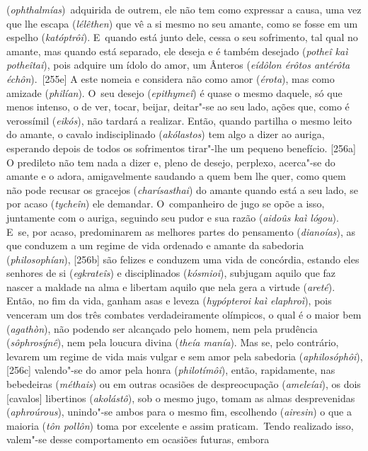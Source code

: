 (\emph{ophthalmías})~adquirida de outrem, ele não tem como expressar a
causa, uma vez que lhe escapa (\emph{lélêthen}) que vê a si mesmo no seu
amante, como se fosse em um espelho (\emph{katóptrôi}). E~quando está
junto dele, cessa o seu sofrimento, tal qual no amante, mas quando está
separado, ele deseja e é também desejado (\emph{potheî kaì potheîtai}),
pois adquire um ídolo do amor, um Ânteros (\emph{eídôlon érôtos antérôta
échôn}).~[255e] A este nomeia e considera não como amor
(\emph{érota}), mas como amizade (\emph{philían}). O~seu desejo
(\emph{epithymeî}) é quase o mesmo daquele, só que menos intenso, o de
ver, tocar, beijar, deitar"-se ao seu lado, ações que, como é verossímil
(\emph{eikós}), não tardará a realizar. Então, quando partilha o mesmo
leito do amante, o cavalo indisciplinado (\emph{akólastos}) tem algo a
dizer ao auriga, esperando depois de todos os sofrimentos tirar"-lhe um
pequeno benefício. [256a] O predileto não tem nada a dizer e, pleno
de desejo, perplexo, acerca"-se do amante e o adora, amigavelmente
saudando a quem bem lhe quer, como quem não pode recusar os gracejos
(\emph{charísasthai}) do amante quando está a seu lado, se por acaso
(\emph{tycheîn}) ele demandar. O~companheiro de jugo se opõe a isso,
juntamente com o auriga, seguindo seu pudor e sua razão (\emph{aidoûs
kaì lógou}). E~se, por acaso, predominarem as melhores partes do
pensamento (\emph{dianoías}), as que conduzem a um regime de vida
ordenado e amante da sabedoria (\emph{philosophían}), [256b] são
felizes e conduzem uma vida de concórdia, estando eles senhores de si
(\emph{egkrateîs}) e disciplinados (\emph{kósmioi}), subjugam aquilo que
faz nascer a maldade na alma e libertam aquilo que nela gera a virtude
(\emph{areté}). Então, no fim da vida, ganham asas e leveza
(\emph{hypópteroi kaì elaphroì}), pois venceram um dos três combates
verdadeiramente olímpicos, o qual é o maior bem (\emph{agathòn}), não
podendo ser alcançado pelo homem, nem pela prudência
(\emph{sôphrosýnê}), nem pela loucura divina (\emph{theía manía}). Mas
se, pelo contrário, levarem um regime de vida mais vulgar e sem amor
pela sabedoria (\emph{aphilosóphôi}), [256c] valendo"-se do amor pela
honra (\emph{philotímôi}), então, rapidamente, nas bebedeiras
(\emph{méthais}) ou em outras ocasiões de despreocupação
(\emph{ameleíai}), os dois [cavalos] libertinos (\emph{akolástô}),
sob o mesmo jugo, tomam as almas desprevenidas (\emph{aphroúrous}),
unindo"-se ambos para o mesmo fim, escolhendo (\emph{airesin}) o que a
maioria (\emph{tôn pollôn}) toma por excelente e assim praticam.~Tendo
realizado isso, valem"-se desse comportamento em ocasiões futuras, embora
